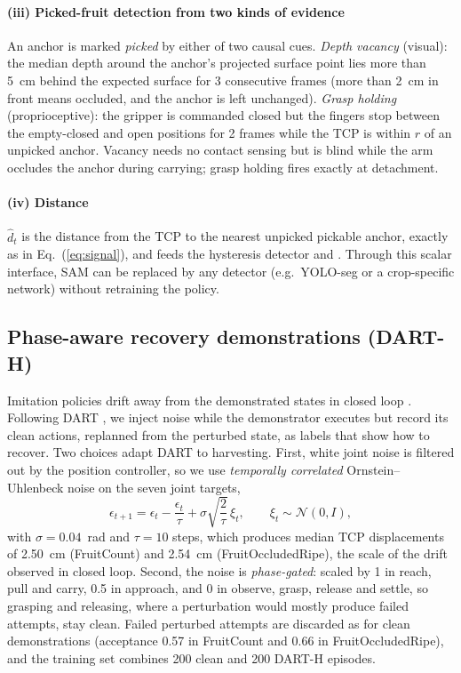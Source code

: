 \paragraph{(iii) Picked-fruit detection from two kinds of evidence} An anchor is marked \emph{picked} by either of two causal cues. \emph{Depth vacancy} (visual): the median depth around the anchor's projected surface point lies more than 5~cm behind the expected surface for 3 consecutive frames (more than 2~cm in front means occluded, and the anchor is left unchanged). \emph{Grasp holding} (proprioceptive): the gripper is commanded closed but the fingers stop between the empty-closed and open positions for 2 frames while the TCP is within $r$ of an unpicked anchor. Vacancy needs no contact sensing but is blind while the arm occludes the anchor during carrying; grasp holding fires exactly at detachment.

\paragraph{(iv) Distance} $\hat d_t$ is the distance from the TCP to the nearest unpicked pickable anchor, exactly as in Eq.~(\ref{eq:signal}), and feeds the hysteresis detector and \pekm. Through this scalar interface, SAM can be replaced by any detector (e.g.\ YOLO-seg or a crop-specific network) without retraining the policy.

\subsection{Phase-aware recovery demonstrations (DART-H)}
\label{sec:dart}
\label{sec:training}
Imitation policies drift away from the demonstrated states in closed loop \citep{ross2011dagger}. Following DART \citep{laskey2017dart}, we inject noise while the demonstrator executes but record its clean actions, replanned from the perturbed state, as labels that show how to recover. Two choices adapt DART to harvesting. First, white joint noise is filtered out by the position controller, so we use \emph{temporally correlated} Ornstein--Uhlenbeck noise on the seven joint targets,
\begin{equation}
\epsilon_{t+1} = \epsilon_t - \frac{\epsilon_t}{\tau} + \sigma\sqrt{\frac{2}{\tau}}\,\xi_t,\qquad \xi_t \sim \mathcal{N}(0, I),
\end{equation}
with $\sigma=0.04$~rad and $\tau=10$ steps, which produces median TCP displacements of 2.50~cm (FruitCount) and 2.54~cm (FruitOccludedRipe), the scale of the drift observed in closed loop. Second, the noise is \emph{phase-gated}: scaled by 1 in reach, pull and carry, 0.5 in approach, and 0 in observe, grasp, release and settle, so grasping and releasing, where a perturbation would mostly produce failed attempts, stay clean. Failed perturbed attempts are discarded as for clean demonstrations (acceptance 0.57 in FruitCount and 0.66 in FruitOccludedRipe), and the training set combines 200 clean and 200 DART-H episodes.

